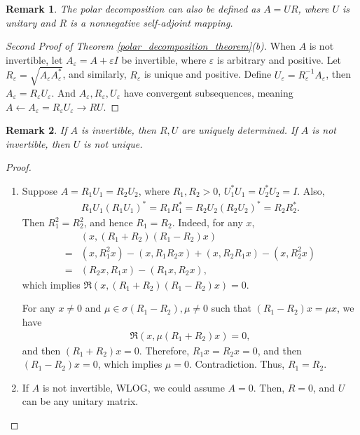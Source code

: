 \documentclass[11pt]{book}
\newtheorem{remark}{Remark}[chapter]
\theoremstyle{definition}
\numberwithin{equation}{chapter}
\begin{document}
\begin{remark}
The polar decomposition can also be defined as $A = UR$, where $U$ is unitary and $R$ is a nonnegative self-adjoint mapping.
\end{remark}

\medskip

\begin{proof}[Second Proof of Theorem \ref{polar_decomposition_theorem}(b)]
When $A$ is not invertible, let $A_\varepsilon = A + \varepsilon I$ be invertible, where $\varepsilon$ is arbitrary and positive. Let $R_\varepsilon = \sqrt{A_\varepsilon A_\varepsilon^*}$, and similarly, $R_\varepsilon$ is unique and positive. Define $U_\varepsilon = R_\varepsilon^{-1} A_\varepsilon$, then $A_\varepsilon = R_\varepsilon U_\varepsilon$. And $A_\varepsilon, R_\varepsilon, U_\varepsilon$ have convergent subsequences, meaning $A \gets A_\varepsilon = R_\varepsilon U_\varepsilon \to RU$.
\end{proof}

\begin{remark}
If $A$ is invertible, then $R, U$ are uniquely determined. If $A$ is not invertible, then $U$ is not unique.
\end{remark}
\begin{proof}
~\begin{enumerate}[label=(\alph*)]
    \item Suppose $A = R_1U_1 = R_2 U_2$, where $R_1, R_2 > 0$, $U_1^* U_1 = U_2^* U_2 = I$. Also,
    \begin{align*}
        R_1 U_1 \left(R_1 U_1\right)^* = R_1 R_1^* = R_2 U_2 \left(R_2 U_2\right)^* = R_2 R_2^*.
    \end{align*}
    Then $R_1^2 = R_2^2$, and hence $R_1 = R_2$. Indeed, for any $x$, 
    \begin{align*}
        & \left(x, (R_1 + R_2)(R_1 - R_2)x\right) \\
        = & (x, R_1^2x) - (x, R_1 R_2 x) + (x, R_2 R_1 x) - (x, R_2^2x) \\
        = & (R_2 x, R_1 x) - (R_1 x, R_2 x),
    \end{align*}
    which implies $\Re\left(x, (R_1 + R_2)(R_1 - R_2)x\right) = 0$. 
    
    For any $x \neq 0$ and $\mu \in \sigma(R_1 - R_2), \mu \neq 0$ such that $(R_1 - R_2)x = \mu x$, we have
    \begin{align*}
        \Re\left(x, \mu (R_1 + R_2) x\right) = 0,
    \end{align*}
    and then $(R_1 + R_2) x = 0$. Therefore, $R_1 x = R_2 x = 0$, and then $(R_1 - R_2)x = 0$, which implies $\mu = 0$. Contradiction. Thus, $R_1 = R_2$.
    
    \item If $A$ is not invertible, WLOG, we could assume $A = 0$. Then, $R = 0$, and $U$ can be any unitary matrix.
\end{enumerate}
\end{proof}
\end{document}
